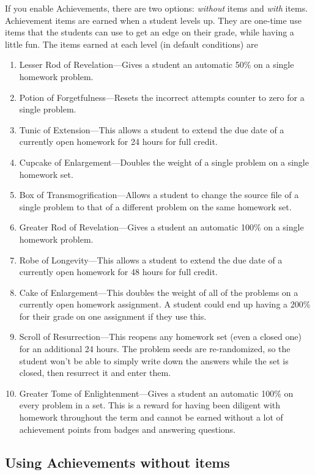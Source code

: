 \documentclass[12pt]{article}
\begin{document}
If you enable Achievements, there are two options: \emph{without} items and \emph{with} items.
Achievement items are earned when a student levels up.
They are one-time use  items that the students can use to get an edge on their grade, while having a little fun.
The items earned at each level (in default conditions) are \begin{enumerate} \item Lesser Rod of Revelation---Gives a student an automatic 50\% on a single homework problem.
	\item Potion of Forgetfulness---Resets the incorrect attempts counter to zero for a single problem.
	\item Tunic of Extension---This allows a student to extend the due date of a currently open homework for 24 hours for full credit.
	\item Cupcake of Enlargement---Doubles the weight of a single problem on a single homework set.
	\item Box of Transmogrification---Allows a student to change the source file of a single problem to that of a different problem on the same homework set.
	\item Greater Rod of Revelation---Gives a student an automatic 100\% on a single homework problem.
	\item Robe of Longevity---This allows a student to extend the due date of a currently open homework for 48 hours for full credit.
	\item Cake of Enlargement---This doubles the weight of all of the problems on a currently open homework assignment.
	      A student could end up having a 200\% for their grade on one assignment if they use this.
	\item Scroll of Resurrection---This reopens any homework set (even a closed one) for an additional 24 hours.
	      The problem seeds are re-randomized, so the student won't be able to simply write down the answers while the set is closed, then resurrect it and enter them.
	\item Greater Tome of Enlightenment---Gives a student an automatic 100\% on every problem in a set.
	      This is a reward for having been diligent with homework throughout the term and cannot be earned without a lot of achievement points from badges and answering questions.
\end{enumerate}

\subsection{Using Achievements without items}
\end{document}
